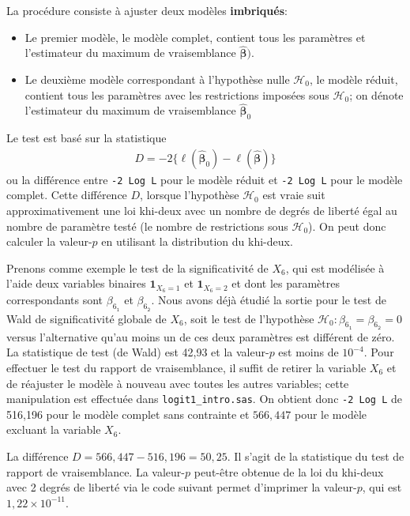\documentclass[
  11pt,
  letterpaper,
]{book}
\providecommand{\tightlist}{%
  \setlength{\itemsep}{0pt}\setlength{\parskip}{0pt}}
\theoremstyle{definition}
\theoremstyle{definition}
\theoremstyle{definition}
\theoremstyle{remark}
\begin{document}
La procédure consiste à ajuster deux modèles \textbf{imbriqués}:

\begin{itemize}
\tightlist
\item
  Le premier modèle, le modèle complet, contient tous les paramètres et l'estimateur du maximum de vraisemblance \(\widehat{\boldsymbol{\beta}})\).
\item
  Le deuxième modèle correspondant à l'hypothèse nulle \(\mathcal{H}_0\), le modèle réduit, contient tous les paramètres avec les restrictions imposées sous \(\mathcal{H}_0\); on dénote l'estimateur du maximum de vraisemblance \(\widehat{\boldsymbol{\beta}}_0\)
\end{itemize}

Le test est basé sur la statistique
\begin{align*}
 D = -2\{\ell(\widehat{\boldsymbol{\beta}}_0)-\ell(\widehat{\boldsymbol{\beta}})\}
\end{align*}
ou la différence entre \texttt{-2\ Log\ L} pour le modèle réduit et \texttt{-2\ Log\ L} pour le modèle complet. Cette différence \(D\), lorsque l'hypothèse \(\mathcal{H}_0\) est vraie suit approximativement une loi khi-deux avec un nombre de degrés de liberté égal au nombre de paramètre testé (le nombre de restrictions sous \(\mathcal{H}_0\)). On peut donc calculer la valeur-\(p\) en utilisant la distribution du khi-deux.

Prenons comme exemple le test de la significativité de \(X_6\), qui est modélisée à l'aide deux variables binaires \({\mathbf 1}_{X_6=1}\) et \({\mathbf 1}_{X_6=2}\) et dont les paramètres correspondants sont \(\beta_{6_{\texttt{1}}}\) et \(\beta_{6_{\texttt{2}}}\). Nous avons déjà étudié la sortie pour le test de Wald de significativité globale de \(X_6\), soit le test de l'hypothèse \(\mathcal{H}_0: \beta_{6_{\texttt{1}}}=\beta_{6_{\texttt{2}}}=0\) versus l'alternative qu'au moins un de ces deux paramètres est différent de zéro. La statistique de test (de Wald) est 42,93 et la valeur-\(p\) est moins de \(10^{-4}\). Pour effectuer le test du rapport de vraisemblance, il suffit de retirer la variable \(X_6\) et de réajuster le modèle à nouveau avec toutes les autres variables; cette manipulation est effectuée dans \texttt{logit1\_intro.sas}. On obtient donc
\texttt{-2\ Log\ L} de 516,196 pour le modèle complet sans contrainte et \(566,447\) pour le modèle excluant la variable \(X_6\).

La différence \(D = 566,447 - 516,196 = 50,25\). Il s'agit de la statistique du test de rapport de vraisemblance. La valeur-\(p\) peut-être obtenue de la loi du khi-deux avec 2 degrés de liberté via le code suivant permet d'imprimer la valeur-\(p\), qui est \(1,22 \times 10^{-11}\).
\end{document}
